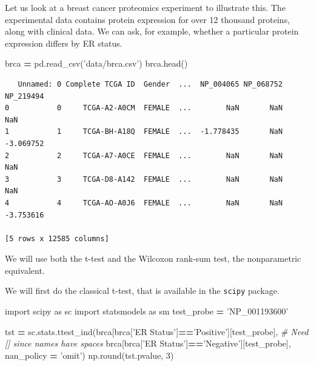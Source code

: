 \documentclass[
  letterpaper,
]{scrbook}
\newenvironment{Shaded}{\begin{snugshade}}{\end{snugshade}}
\newcommand{\BuiltInTok}[1]{#1}
\newcommand{\CommentTok}[1]{\textcolor[rgb]{0.56,0.35,0.01}{\textit{#1}}}
\newcommand{\DecValTok}[1]{\textcolor[rgb]{0.00,0.00,0.81}{#1}}
\newcommand{\ImportTok}[1]{#1}
\newcommand{\NormalTok}[1]{#1}
\newcommand{\OperatorTok}[1]{\textcolor[rgb]{0.81,0.36,0.00}{\textbf{#1}}}
\newcommand{\StringTok}[1]{\textcolor[rgb]{0.31,0.60,0.02}{#1}}
\begin{document}
Let us look at a breast cancer proteomics experiment to illustrate this. The experimental data contains protein expression for over 12 thousand proteins, along with clinical data. We can ask, for example, whether a particular protein expression differs by ER status.

\begin{Shaded}
\begin{Highlighting}[]
\NormalTok{brca }\OperatorTok{=}\NormalTok{ pd.read_csv(}\StringTok{'data/brca.csv'}\NormalTok{)}
\NormalTok{brca.head()}
\end{Highlighting}
\end{Shaded}

\begin{verbatim}
   Unnamed: 0 Complete TCGA ID  Gender  ...  NP_004065 NP_068752 NP_219494
0           0     TCGA-A2-A0CM  FEMALE  ...        NaN       NaN       NaN
1           1     TCGA-BH-A18Q  FEMALE  ...  -1.778435       NaN -3.069752
2           2     TCGA-A7-A0CE  FEMALE  ...        NaN       NaN       NaN
3           3     TCGA-D8-A142  FEMALE  ...        NaN       NaN       NaN
4           4     TCGA-AO-A0J6  FEMALE  ...        NaN       NaN -3.753616

[5 rows x 12585 columns]
\end{verbatim}

We will use both the t-test and the Wilcoxon rank-sum test, the nonparametric equivalent.

We will first do the classical t-test, that is available in the \texttt{scipy} package.

\begin{Shaded}
\begin{Highlighting}[]
\ImportTok{import}\NormalTok{ scipy }\ImportTok{as}\NormalTok{ sc}
\ImportTok{import}\NormalTok{ statsmodels }\ImportTok{as}\NormalTok{ sm}
\NormalTok{test_probe }\OperatorTok{=} \StringTok{'NP_001193600'}

\NormalTok{tst }\OperatorTok{=}\NormalTok{ sc.stats.ttest_ind(brca[brca[}\StringTok{'ER Status'}\NormalTok{]}\OperatorTok{==}\StringTok{'Positive'}\NormalTok{][test_probe], }\CommentTok{# Need [] since names have spaces}
\NormalTok{                   brca[brca[}\StringTok{'ER Status'}\NormalTok{]}\OperatorTok{==}\StringTok{'Negative'}\NormalTok{][test_probe], }
\NormalTok{                  nan_policy }\OperatorTok{=} \StringTok{'omit'}\NormalTok{)}
\NormalTok{np.}\BuiltInTok{round}\NormalTok{(tst.pvalue, }\DecValTok{3}\NormalTok{)}
\end{Highlighting}
\end{Shaded}
\end{document}
